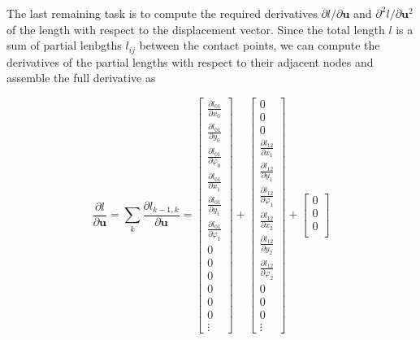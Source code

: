 The last remaining task is to compute the required derivatives $\partial l/\partial \boldsymbol{u}$ and $\partial^2 l/\partial \boldsymbol{u}^2$ of the length with respect to the displacement vector.
Since the total length $l$ is a sum of partial lenbgths $l_{ij}$ between the contact points, we can compute the derivatives of the partial lengths with respect to their adjacent nodes and assemble the full derivative as

\begin{equation}
\renewcommand\arraystretch{1.5}
\frac{\partial l}{\partial \boldsymbol{u}} = \sum_{k} \frac{\partial l_{k-1,k}}{\partial \boldsymbol{u}} =
\begin{bmatrix}
\frac{\partial l_{01}}{\partial x_{0}} \\
\frac{\partial l_{01}}{\partial y_{0}} \\
\frac{\partial l_{01}}{\partial \varphi_{0}} \\
\frac{\partial l_{01}}{\partial x_{1}} \\
\frac{\partial l_{01}}{\partial y_{1}} \\
\frac{\partial l_{01}}{\partial \varphi_{1}} \\
0 \\
0 \\
0 \\
0 \\
0 \\
0 \\
\vdots
\end{bmatrix}
+
\begin{bmatrix}
0 \\
0 \\
0 \\
\frac{\partial l_{12}}{\partial x_{1}} \\
\frac{\partial l_{12}}{\partial y_{1}} \\
\frac{\partial l_{12}}{\partial \varphi_{1}} \\
\frac{\partial l_{12}}{\partial x_{2}} \\
\frac{\partial l_{12}}{\partial y_{2}} \\
\frac{\partial l_{12}}{\partial \varphi_{2}} \\
0 \\
0 \\
0 \\
\vdots
\end{bmatrix}
+
\begin{bmatrix}
0 \\
0 \\
0 \\

\end{bmatrix}
\end{equation}
